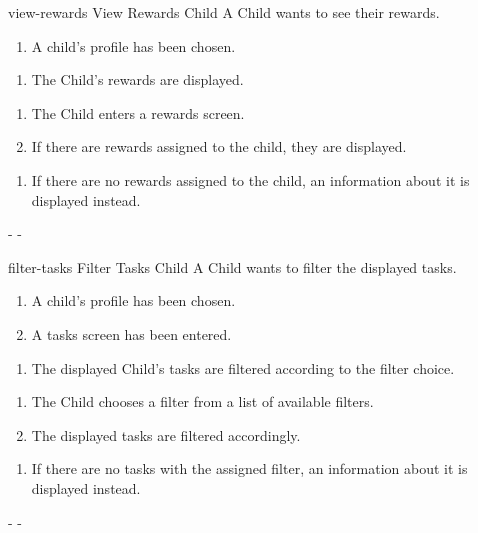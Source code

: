 {view-rewards}
{View Rewards}
{Child}
{A Child wants to see their rewards.}
{\begin{enumerate} %
    \item A child's profile has been chosen.
\end{enumerate}}
{\begin{enumerate} %
    \item The Child's rewards are displayed.
\end{enumerate}}
{\begin{enumerate} %
    \item The Child enters a rewards screen.
    \item If there are rewards assigned to the child, they are displayed.
\end{enumerate}}
{\begin{enumerate} %
[label=2.\alph*.]
    \item If there are no rewards assigned to the child, an information about it is displayed instead.
\end{enumerate}}
{-} %
{-} %


{filter-tasks}
{Filter Tasks}
{Child}
{A Child wants to filter the displayed tasks.}
{\begin{enumerate} %
    \item A child's profile has been chosen.
    \item A tasks screen has been entered.
\end{enumerate}}
{\begin{enumerate} %
    \item The displayed Child's tasks are filtered according to the filter choice. 
\end{enumerate}}
{\begin{enumerate} %
    \item The Child chooses a filter from a list of available filters.
    \item The displayed tasks are filtered accordingly.
\end{enumerate}}
{\begin{enumerate} %
[label=2.\alph*.]
    \item If there are no tasks with the assigned filter, an information about it is displayed instead.
\end{enumerate}}
{-} %
{-} %


